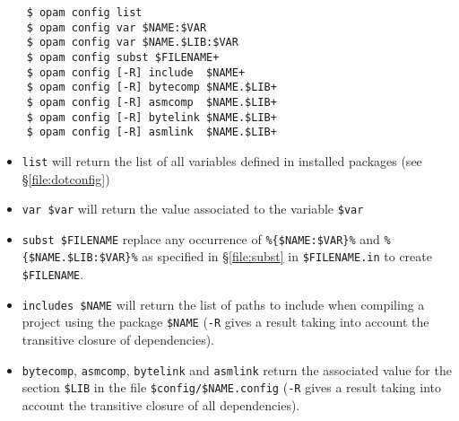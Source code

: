 \documentclass[a4paper,11pt]{article}
\begin{document}
\begin{verbatim}
    $ opam config list
    $ opam config var $NAME:$VAR
    $ opam config var $NAME.$LIB:$VAR
    $ opam config subst $FILENAME+
    $ opam config [-R] include  $NAME+
    $ opam config [-R] bytecomp $NAME.$LIB+
    $ opam config [-R] asmcomp  $NAME.$LIB+
    $ opam config [-R] bytelink $NAME.$LIB+
    $ opam config [-R] asmlink  $NAME.$LIB+
\end{verbatim}

\begin{itemize}
\item \verb+list+ will return the list of all variables defined
  in installed packages (see \S\ref{file:dotconfig})
\item \verb+var $var+ will return the value associated to the
  variable \verb+$var+
\item \verb+subst $FILENAME+ replace any occurrence of
  \verb+%{$NAME:$VAR}%+ and \verb+%{$NAME.$LIB:$VAR}%+ as specified in
  \S\ref{file:subst} in \verb+$FILENAME.in+ to create \verb+$FILENAME+.
\item \verb+includes $NAME+ will return the list of paths to include when
  compiling a project using the package \verb+$NAME+ (\verb+-R+ gives
  a result taking into account the transitive closure of
  dependencies).
\item \verb+bytecomp+, \verb+asmcomp+, \verb+bytelink+ and
  \verb+asmlink+ return the associated value for the section
  \verb+$LIB+ in the file \verb+$config/$NAME.config+ (\verb+-R+ gives
  a result taking into account the transitive closure of all
  dependencies).
\end{itemize}
\end{document}
